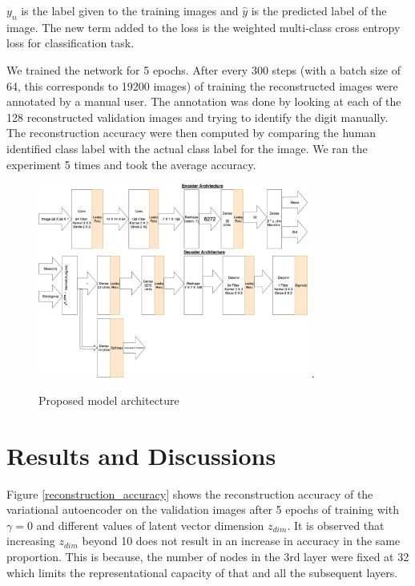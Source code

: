 \documentclass{uai2021} %
\begin{document}
$y_n$ is the label given to the training images and $\hat{y}$ is the predicted label of the image.
The new term added to the loss is the weighted multi-class cross entropy loss for classification task.

We trained the network for 5 epochs.
After every 300 steps (with a batch size of 64, this corresponds to 19200 images) of training the reconstructed images were annotated by a manual user.
The annotation was done by looking at each of the 128  reconstructed validation images and trying to identify the digit manually.
The reconstruction accuracy were then computed by comparing the human identified class label with the actual class label for the image.
We ran the experiment 5 times and took the average accuracy.


\begin{figure}[!t]
\centering
\includegraphics[width=3.5in]{vae_model_architecture_classification.jpg}
\DeclareGraphicsExtensions.
\caption{Proposed model architecture}
\label{vae_architecture}
\end{figure}

\section{Results and Discussions} \label{results}
Figure \ref{reconstruction_accuracy} shows  the reconstruction accuracy of the variational autoencoder on the validation images after 5 epochs of training with $\gamma = 0$  and different values of latent vector dimension $z_{dim}$.
It is observed that increasing $z_{dim}$ beyond 10 does not result in an increase in accuracy in the same proportion. This is because, the number of nodes in the 3rd layer were fixed at 32 which limits the representational capacity of that and all the subsequent layers.
\end{document}

